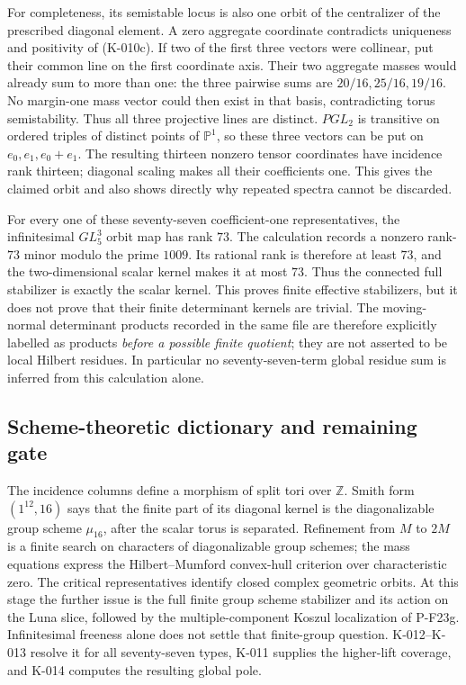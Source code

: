 For completeness, its semistable locus is also one orbit of the
centralizer of the prescribed diagonal element.  A zero aggregate
coordinate contradicts uniqueness and positivity of (K-010c).  If two
of the first three vectors were collinear, put their common line on
the first coordinate axis.  Their two aggregate masses would already
sum to more than one: the three pairwise sums are $20/16,25/16,19/16$.
No margin-one mass vector could then exist in that basis, contradicting
torus semistability.  Thus all three projective lines are distinct.
$PGL_2$ is transitive on ordered triples of distinct points of $\mathbb P^1$,
so these three vectors can be put on $e_0,e_1,e_0+e_1$.  The resulting
thirteen nonzero tensor coordinates have incidence rank thirteen;
diagonal scaling makes all their coefficients one.  This gives the
claimed orbit and also shows directly why repeated spectra cannot be
discarded.

For every one of these seventy-seven coefficient-one representatives,
the infinitesimal $GL_5^3$ orbit map has rank $73$.  The calculation
records a nonzero rank-$73$ minor modulo the prime $1009$.  Its rational
rank is therefore at least $73$, and the two-dimensional scalar kernel
makes it at most $73$.  Thus the connected full stabilizer is exactly
the scalar kernel.  This proves finite effective stabilizers, but it
does not prove that their finite determinant kernels are trivial.
The moving-normal determinant products recorded in the same file are
therefore explicitly labelled as products \emph{before a possible
finite quotient}; they are not asserted to be local Hilbert residues.
In particular no seventy-seven-term global residue sum is inferred
from this calculation alone.

\subsection*{Scheme-theoretic dictionary and remaining gate}
The incidence columns define a morphism of split tori over $\mathbb Z$.
Smith form $(1^{12},16)$ says that the finite part of its diagonal kernel
is the diagonalizable group scheme $\mu_{16}$, after the scalar torus is
separated.  Refinement from $M$ to $2M$ is a finite search on characters
of diagonalizable group schemes; the mass equations express the
Hilbert--Mumford convex-hull criterion over characteristic zero.
The critical representatives identify closed complex geometric orbits.
At this stage the further issue is the full finite group scheme
stabilizer and its action on the Luna slice, followed by the
multiple-component Koszul localization of P-F23g.  Infinitesimal
freeness alone does not settle that finite-group question.
K-012--K-013 resolve it for all seventy-seven types, K-011 supplies
the higher-lift coverage, and K-014 computes the resulting global pole.
